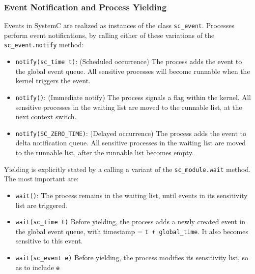 \documentclass[11pt]{article}
\begin{document}
\subsubsection{Event Notification and Process Yielding}
\label{sec:org5a7ec61}
Events in SystemC are realized as instances of the class \texttt{sc\_event}.
Processes perform event notifications, by calling either of these variations of the \texttt{sc\_event.notify} method:
\begin{itemize}
\item \texttt{notify(sc\_time t)}:     (Scheduled occurrence) The process adds the event to the global event queue. All sensitive processes will become runnable when the kernel triggers the event.
\item \texttt{notify()}:               (Immediate notify)    The process signals a flag within the kernel. All sensitive processes in the waiting list are moved to the runnable list, at the next context switch.
\item \texttt{notify(SC\_ZERO\_TIME)}: (Delayed occurrence)   The process adds the event to delta notification queue. All sensitive processes in the waiting list are moved to the runnable list, after the runnable list becomes empty.
\end{itemize}


Yielding is explicitly stated by a calling a variant of the \texttt{sc\_module.wait} method. The most important are:
\begin{itemize}
\item \texttt{wait()}:            The process remains in the waiting list, until events in its sensitivity list are triggered.
\item \texttt{wait(sc\_time t)}   Before yielding, the process adds a newly created event in the global event queue, with timestamp = \texttt{t + global\_time}. It also becomes sensitive to this event.
\item \texttt{wait(sc\_event e)}  Before yielding, the process modifies its sensitivity list, so as to include \texttt{e}
\end{itemize}
\end{document}

